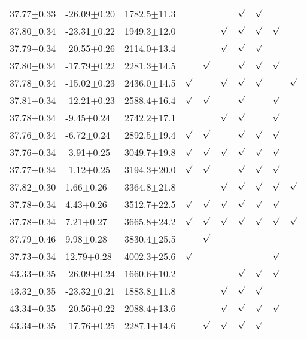\begin{table}[h]
\begin{center}
\begin{tabular}{llllllllll}
37.77$\pm$0.33 & -26.09$\pm$0.20 & 1782.5$\pm$11.3& & & & $\surd$ & $\surd$ & & \\
37.80$\pm$0.34 & -23.31$\pm$0.22 & 1949.3$\pm$12.0& & & $\surd$ & $\surd$ & $\surd$ & $\surd$ & \\
37.79$\pm$0.34 & -20.55$\pm$0.26 & 2114.0$\pm$13.4& & & $\surd$ & $\surd$ & $\surd$ & & \\
37.80$\pm$0.34 & -17.79$\pm$0.22 & 2281.3$\pm$14.5& & $\surd$ & & $\surd$ & $\surd$ & $\surd$ & \\
37.78$\pm$0.34 & -15.02$\pm$0.23 & 2436.0$\pm$14.5& $\surd$ & & $\surd$ & $\surd$ & $\surd$ & & $\surd$ \\
37.81$\pm$0.34 & -12.21$\pm$0.23 & 2588.4$\pm$16.4& $\surd$ & $\surd$ & & $\surd$ & & $\surd$ & \\
37.78$\pm$0.34 & -9.45$\pm$0.24 & 2742.2$\pm$17.1& & & $\surd$ & $\surd$ & & $\surd$ & \\
37.76$\pm$0.34 & -6.72$\pm$0.24 & 2892.5$\pm$19.4& $\surd$ & $\surd$ & & $\surd$ & $\surd$ & $\surd$ & \\
37.76$\pm$0.34 & -3.91$\pm$0.25 & 3049.7$\pm$19.8& $\surd$ & $\surd$ & $\surd$ & $\surd$ & $\surd$ & $\surd$ & \\
37.77$\pm$0.34 & -1.12$\pm$0.25 & 3194.3$\pm$20.0& $\surd$ & $\surd$ & & $\surd$ & $\surd$ & $\surd$ & \\
37.82$\pm$0.30 & 1.66$\pm$0.26 & 3364.8$\pm$21.8& & & $\surd$ & $\surd$ & $\surd$ & $\surd$ & $\surd$ \\
37.78$\pm$0.34 & 4.43$\pm$0.26 & 3512.7$\pm$22.5& $\surd$ & $\surd$ & $\surd$ & $\surd$ & $\surd$ & $\surd$ & \\
37.78$\pm$0.34 & 7.21$\pm$0.27 & 3665.8$\pm$24.2& $\surd$ & $\surd$ & $\surd$ & $\surd$ & $\surd$ & $\surd$ & $\surd$ \\
37.79$\pm$0.46 & 9.98$\pm$0.28 & 3830.4$\pm$25.5& & $\surd$ & & & & & \\
37.73$\pm$0.34 & 12.79$\pm$0.28 & 4002.3$\pm$25.6& $\surd$ & & & & & $\surd$ & \\
43.33$\pm$0.35 & -26.09$\pm$0.24 & 1660.6$\pm$10.2& & & & $\surd$ & $\surd$ & $\surd$ & \\
43.32$\pm$0.35 & -23.32$\pm$0.21 & 1883.8$\pm$11.8& & & $\surd$ & $\surd$ & $\surd$ & & \\
43.34$\pm$0.35 & -20.56$\pm$0.22 & 2088.4$\pm$13.6& & & $\surd$ & $\surd$ & $\surd$ & $\surd$ & \\
43.34$\pm$0.35 & -17.76$\pm$0.25 & 2287.1$\pm$14.6& & $\surd$ & $\surd$ & $\surd$ & $\surd$ & & \\

\end{tabular}
\end{center}
\end{table}
